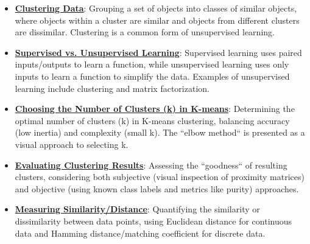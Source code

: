 \documentclass{article}%
\begin{document}
\begin{itemize}[leftmargin=*]%
\item \href{https://purdue.brightspace.com/d2l/common/assets/pdfjs-d2l-dist/1.0.14-legacy/web/viewer.html?file=\%2Fcontent\%2Fenforced\%2F1095467-wl.202510.CS.24300.001\%2F12L2-distance-clusters.pdf\%3Fou\%3D1095467\&lang=en-us\&container=d2l-fileviewer-rendered-pdf\&fullscreen=d2l-fileviewer-rendered-pdf-dialog\&height=667#page=4}{\textbf{Clustering Data}}: Grouping a set of objects into classes of similar objects, where objects within a cluster are similar and objects from different clusters are dissimilar. Clustering is a common form of unsupervised learning.%
\item \href{https://purdue.brightspace.com/d2l/common/assets/pdfjs-d2l-dist/1.0.14-legacy/web/viewer.html?file=\%2Fcontent\%2Fenforced\%2F1095467-wl.202510.CS.24300.001\%2F12L2-distance-clusters.pdf\%3Fou\%3D1095467\&lang=en-us\&container=d2l-fileviewer-rendered-pdf\&fullscreen=d2l-fileviewer-rendered-pdf-dialog\&height=667#page=3}{\textbf{Supervised vs. Unsupervised Learning}}: Supervised learning uses paired inputs/outputs to learn a function, while unsupervised learning uses only inputs to learn a function to simplify the data. Examples of unsupervised learning include clustering and matrix factorization.%
\item \href{https://purdue.brightspace.com/d2l/common/assets/pdfjs-d2l-dist/1.0.14-legacy/web/viewer.html?file=\%2Fcontent\%2Fenforced\%2F1095467-wl.202510.CS.24300.001\%2F12L2-distance-clusters.pdf\%3Fou\%3D1095467\&lang=en-us\&container=d2l-fileviewer-rendered-pdf\&fullscreen=d2l-fileviewer-rendered-pdf-dialog\&height=667#page=33}{\textbf{Choosing the Number of Clusters (k) in K{-}means}}: Determining the optimal number of clusters (k) in K-means clustering, balancing accuracy (low inertia) and complexity (small k). The ``elbow method`` is presented as a visual approach to selecting k.%
\item \href{https://purdue.brightspace.com/d2l/common/assets/pdfjs-d2l-dist/1.0.14-legacy/web/viewer.html?file=\%2Fcontent\%2Fenforced\%2F1095467-wl.202510.CS.24300.001\%2F12L2-distance-clusters.pdf\%3Fou\%3D1095467\&lang=en-us\&container=d2l-fileviewer-rendered-pdf\&fullscreen=d2l-fileviewer-rendered-pdf-dialog\&height=667#page=32}{\textbf{Evaluating Clustering Results}}: Assessing the ``goodness`` of resulting clusters, considering both subjective (visual inspection of proximity matrices) and objective (using known class labels and metrics like purity) approaches.%
\item \href{https://purdue.brightspace.com/d2l/common/assets/pdfjs-d2l-dist/1.0.14-legacy/web/viewer.html?file=\%2Fcontent\%2Fenforced\%2F1095467-wl.202510.CS.24300.001\%2F12L2-distance-clusters.pdf\%3Fou\%3D1095467\&lang=en-us\&container=d2l-fileviewer-rendered-pdf\&fullscreen=d2l-fileviewer-rendered-pdf-dialog\&height=667#page=17}{\textbf{Measuring Similarity/Distance}}: Quantifying the similarity or dissimilarity between data points, using Euclidean distance for continuous data and Hamming distance/matching coefficient for discrete data.%

\end{itemize}
\end{document}
